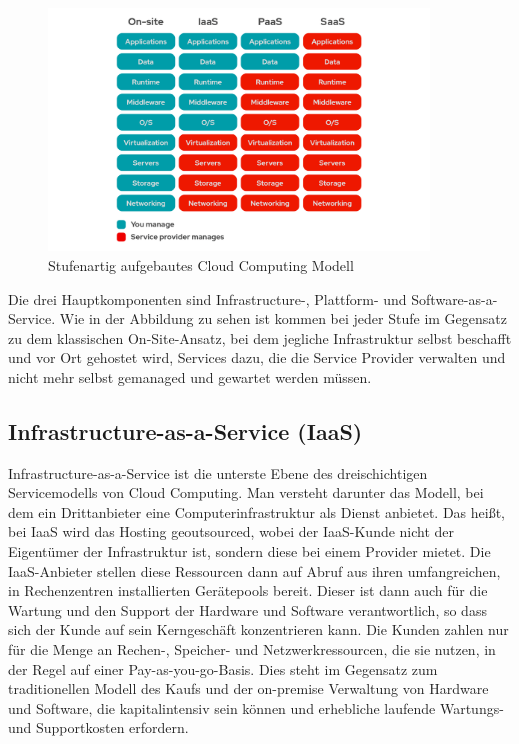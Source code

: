 \begin{figure}
  \centering
  \includegraphics[width=0.9\textwidth]{bilder/xaas.png}
  \caption{Stufenartig aufgebautes Cloud Computing Modell \cite{RedHat.2022}}
  \label{fig:xaasmodell}
\end{figure}


Die drei Hauptkomponenten sind Infrastructure-, Plattform- und Software-as-a-Service. Wie in der Abbildung zu sehen ist kommen bei jeder Stufe im Gegensatz zu dem klassischen On-Site-Ansatz, bei dem jegliche Infrastruktur selbst beschafft und vor Ort gehostet wird, Services dazu, die die Service Provider verwalten und nicht mehr selbst gemanaged und gewartet werden müssen. \cite[vgl.][]{RedHat.2022}


\subsection{Infrastructure-as-a-Service (IaaS)}
Infrastructure-as-a-Service ist die unterste Ebene des dreischichtigen Servicemodells von Cloud Computing. Man versteht darunter das Modell, bei dem ein Drittanbieter eine Computerinfrastruktur als Dienst anbietet. Das heißt, bei IaaS wird das Hosting geoutsourced, wobei der IaaS-Kunde nicht der Eigentümer der Infrastruktur ist, sondern diese bei einem Provider mietet. Die IaaS-Anbieter stellen diese Ressourcen dann auf Abruf aus ihren umfangreichen, in Rechenzentren installierten Gerätepools bereit. Dieser ist dann auch für die Wartung und den Support der Hardware und Software verantwortlich, so dass sich der Kunde auf sein Kerngeschäft konzentrieren kann. Die Kunden zahlen nur für die Menge an Rechen-, Speicher- und Netzwerkressourcen, die sie nutzen, in der Regel auf einer Pay-as-you-go-Basis. Dies steht im Gegensatz zum traditionellen Modell des Kaufs und der on-premise Verwaltung von Hardware und Software, die kapitalintensiv sein können und erhebliche laufende Wartungs- und Supportkosten erfordern.

